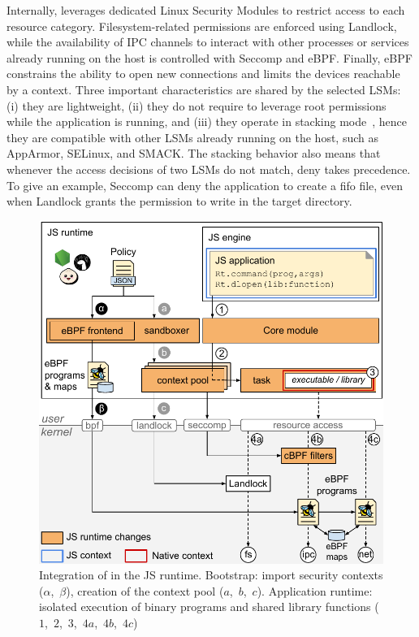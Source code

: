 Internally, \pap leverages dedicated Linux Security Modules to
restrict access to each resource category.  Filesystem-related
permissions are enforced using Landlock, while the availability of IPC
channels to interact with other processes or services already running
on the host is controlled with Seccomp and eBPF. Finally, eBPF constrains the ability
to open new connections and limits the devices reachable by a context.
Three important characteristics are
shared by the selected LSMs: (i) they are lightweight, (ii) they do
not require to leverage root permissions while the application is
running, and (iii) they operate in stacking
mode~\cite{smalley2001implementing}, hence they are
compatible with other LSMs already running on the host, such as
AppArmor, SELinux, and SMACK. The stacking behavior also means that
whenever the access decisions of two LSMs do not match, deny takes
precedence. To give an example, Seccomp can deny the application to
create a fifo file, even when Landlock grants the permission to write
in the target directory.

\begin{figure}[t]
  \includegraphics[width=\columnwidth]{chapters/natisand/fig/overview_sandbox}
  \caption[Integration of \pap in JS runtimes]{
    Integration of \pap in the JS runtime. Bootstrap: import
    security contexts ($\alpha$,~$\beta$), creation of the context
    pool ($a$,~$b$,~$c$). Application runtime: isolated execution of
    binary programs and shared library functions
    ($1$,~$2$,~$3$,~$4a$,~$4b$,~$4c$)
  }
  \label{fig:overview_sandbox}
\end{figure}
      
